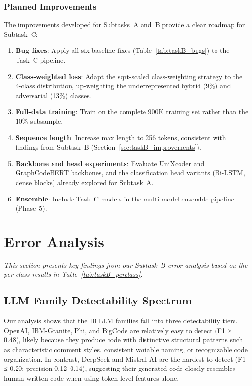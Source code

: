 \documentclass[11pt]{article}
\begin{document}
\subsubsection{Planned Improvements}

The improvements developed for Subtasks~A and~B provide a clear roadmap for Subtask~C:
\begin{enumerate}
    \item \textbf{Bug fixes}: Apply all six baseline fixes (Table~\ref{tab:taskB_bugs}) to the Task~C pipeline.
    \item \textbf{Class-weighted loss}: Adapt the sqrt-scaled class-weighting strategy to the 4-class distribution, up-weighting the underrepresented hybrid (9\%) and adversarial (13\%) classes.
    \item \textbf{Full-data training}: Train on the complete 900K training set rather than the 10\% subsample.
    \item \textbf{Sequence length}: Increase max length to 256 tokens, consistent with findings from Subtask~B (Section~\ref{sec:taskB_improvements}).
    \item \textbf{Backbone and head experiments}: Evaluate UniXcoder and GraphCodeBERT backbones, and the classification head variants (Bi-LSTM, dense blocks) already explored for Subtask~A.
    \item \textbf{Ensemble}: Include Task~C models in the multi-model ensemble pipeline (Phase~5).
\end{enumerate}

\section{Error Analysis}
\label{sec:error}

\textit{This section presents key findings from our Subtask~B error analysis based on the per-class results in Table~\ref{tab:taskB_perclass}.}

\subsection{LLM Family Detectability Spectrum}

Our analysis shows that the 10 LLM families fall into three detectability tiers. OpenAI, IBM-Granite, Phi, and BigCode are relatively easy to detect (F1 ≥ 0.48), likely because they produce code with distinctive structural patterns such as characteristic comment styles, consistent variable naming, or recognizable code organization. In contrast, DeepSeek and Mistral AI are the hardest to detect (F1 ≤ 0.20; precision 0.12–0.14), suggesting their generated code closely resembles human-written code when using token-level features alone.
\end{document}
